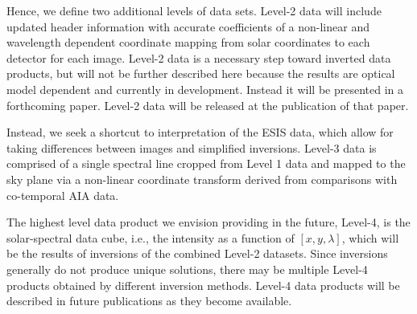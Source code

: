     
    
    Hence, we define two additional levels of data sets.  Level-2 data will include updated header information with accurate coefficients of a non-linear and wavelength dependent coordinate mapping from solar coordinates to each detector for each image.   Level-2 data is a necessary step toward inverted data products,  but will not be further described here because the results are optical model dependent and currently in development.   Instead it will be presented in a forthcoming paper.  Level-2 data will be released at the publication of that paper.  

    Instead, we seek a shortcut to interpretation of the ESIS data, which allow for taking differences between images and simplified inversions.
    Level-3 data is comprised of a single spectral line cropped from Level 1 data and mapped to the sky plane via a non-linear coordinate transform derived from comparisons with co-temporal AIA data.
    
    The highest level data product we envision providing in the future, Level-4, is the solar-spectral data cube, i.e., the intensity as a function of $[x, y , \lambda]$, which will be the results of inversions of the combined Level-2 datasets.     Since inversions generally do not produce unique solutions, there may be multiple Level-4 products obtained by different inversion methods.  Level-4 data products will be described in future publications as they become available.   
    
